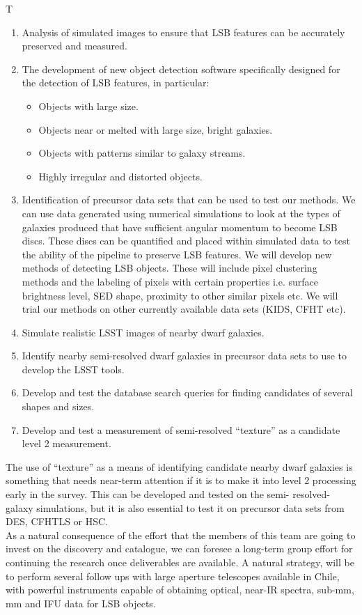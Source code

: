 \begin{tasklist}{T}
\begin{task}
{\begin{enumerate}
\item Analysis of simulated images to ensure that LSB features can be accurately preserved and measured.
\item The development of new object detection software specifically designed for the detection of LSB features, in particular:
\begin{itemize}
\item Objects with large size.
\item Objects near or melted with large size, bright galaxies.
\item Objects with patterns similar to galaxy streams.
\item Highly irregular and distorted objects.
\end{itemize}
\item Identification of precursor data sets that can be used to test our methods.  We can use data generated using numerical simulations to look at the types of galaxies produced that have sufficient angular momentum to become LSB discs. These discs can be quantified and placed within simulated data to test the ability of the pipeline to preserve LSB features. We will develop new methods of detecting LSB objects. These will include pixel clustering methods and the labeling of pixels with certain properties i.e. surface brightness level, SED shape, proximity to other similar pixels etc. We will trial our methods on other currently available data sets (KIDS, CFHT etc).
\item Simulate realistic LSST images of nearby dwarf galaxies.
\item Identify nearby semi-resolved dwarf galaxies in precursor data sets to use to develop the LSST tools.
\item Develop and test the database search queries for finding candidates of several shapes and sizes.
\item Develop and test a measurement of semi-resolved ``texture'' as a candidate level 2 measurement.
\end{enumerate}
The use of ``texture'' as a means of identifying candidate nearby dwarf galaxies is something that needs near-term attention if it is to make it into level 2 processing early in the survey. This can be developed and tested on the semi- resolved-galaxy simulations, but it is also essential to test it on precursor data sets from DES, CFHTLS or HSC.
\\
As a natural consequence of the effort that the members of this team are going to invest on the discovery and catalogue, we can foresee a long-term group effort for continuing the research once deliverables are available. A natural strategy, will be to perform several follow ups with large aperture telescopes available in Chile, with powerful instruments capable of obtaining optical, near-IR spectra, sub-mm, mm and IFU data for LSB objects.
}
\end{task}
\end{tasklist}
